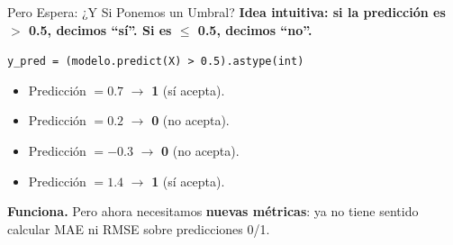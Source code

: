 \documentclass[aspectratio=169, 11pt]{beamer}
\begin{document}
\begin{frame}[shrink=5]{Pero Espera: ¿Y Si Ponemos un Umbral?}
  \vspace{-4pt}
  {\footnotesize\color{arcaDark}\bfseries
    Idea intuitiva: si la predicción es $>$ 0.5, decimos ``sí''.
    Si es $\leq$ 0.5, decimos ``no''.}

  \vspace{8pt}
  \begin{center}
    \begin{tcolorbox}[colback=arcaGray, colframe=arcaRed, boxrule=1pt,
                      arc=4pt, width=0.7\textwidth]
    \centering
    \footnotesize
    \texttt{y\_pred = (modelo.predict(X) > 0.5).astype(int)}
    \end{tcolorbox}
  \end{center}

  \vspace{6pt}
  {\footnotesize
  \begin{itemize}\setlength{\itemsep}{5pt}
    \item[{\color{arcaRed}\faArrowRight}]
      Predicción $= 0.7$ $\to$ \textbf{1} (sí acepta).
    \item[{\color{arcaRed}\faArrowRight}]
      Predicción $= 0.2$ $\to$ \textbf{0} (no acepta).
    \item[{\color{arcaRed}\faArrowRight}]
      Predicción $= -0.3$ $\to$ \textbf{0} (no acepta).
    \item[{\color{arcaRed}\faArrowRight}]
      Predicción $= 1.4$ $\to$ \textbf{1} (sí acepta).
  \end{itemize}
  }

  \vspace{6pt}
  {\footnotesize\color{arcaDark}
    \faLightbulb\hspace{4pt}
    \textbf{Funciona.} Pero ahora necesitamos \textbf{nuevas métricas}:
    ya no tiene sentido calcular MAE ni RMSE sobre predicciones 0/1.}
\end{frame}
\end{document}

